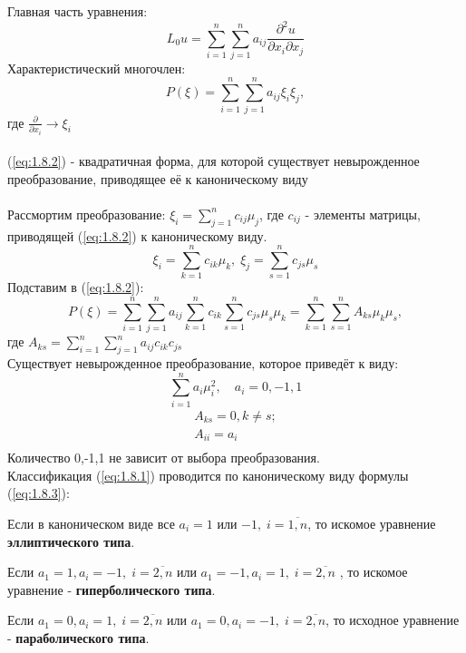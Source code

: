 \documentclass[../main.tex]{subfiles}
\begin{document}
Главная часть уравнения:
$$L_0u = \sum_{i=1}^n \sum_{j=1}^n a_{ij} \frac{\partial^2u}{\partial x_i \partial x_j}$$
Характеристический многочлен: \\
\begin{equation}\label{eq:1.8.2}
	P(\xi) = \sum_{i=1}^n \sum_{j=1}^n a_{ij}\xi_i\xi_j,
\end{equation}
где $\frac{\partial}{\partial x_i} \rightarrow \xi_i$\\
\\
(\ref*{eq:1.8.2}) - квадратичная форма, для которой существует невырожденное преобразование, приводящее её к каноническому виду\\
\\
Рассмортим преобразование:
$\xi_i = \sum_{j=1}^n c_{ij} \mu_j $,
где $c_{ij}$ - элементы матрицы, приводящей (\ref{eq:1.8.2}) к каноническому виду. \\
$$\xi_i = \sum_{k=1}^n c_{ik}\mu_k , \; \xi_j = \sum_{s=1}^n c_{js}\mu_s$$
Подставим в (\ref{eq:1.8.2}): \\
$$P(\xi) = \sum_{i=1}^n \sum_{j=1}^n a_{ij} \sum_{k=1}^n c_{ik} \sum_{s=1}^n c_{js}\mu_s\mu_k = \sum_{k=1}^n\sum_{s=1}^n A_{ks}\mu_k\mu_s,$$
где $A_{ks} = \sum_{i=1}^n\sum_{j=1}^n a_{ij}c_{ik}c_{js} $ \\
Существует невырожденное преобразование, которое приведёт к виду:
\begin{equation}
	\label{eq:1.8.3}
	\sum_{i=1}^n a_i\mu_i^2, \quad a_i = 0,-1,1
\end{equation}
\begin{gather*}
	A_{ks}=0, k \neq s; \\
	A_{ii} = a_i\\
\end{gather*}
Количество 0,-1,1 не зависит от выбора преобразования. \\
Классификация (\ref{eq:1.8.1}) проводится по каноническому виду формулы (\ref{eq:1.8.3}): \\
\par Если в каноническом виде все $a_i = 1$ или $-1, \; i=\overline{1,n}$, то искомое уравнение \textbf{эллиптического типа}. \\
\par Если $a_1 = 1, a_i = -1, \; i = \overline{2,n} $ или $a_1 = -1, a_i = 1, \; i = \overline{2,n}$ , то искомое уравнение - \textbf{гиперболического типа}. \\
\par Если $a_1 = 0, a_i = 1, \; i = \overline{2,n} $ или $a_1=0, a_i = -1, \; i = \overline{2,n}$, то исходное уравнение - \textbf{параболического типа}. \\
\end{document}
